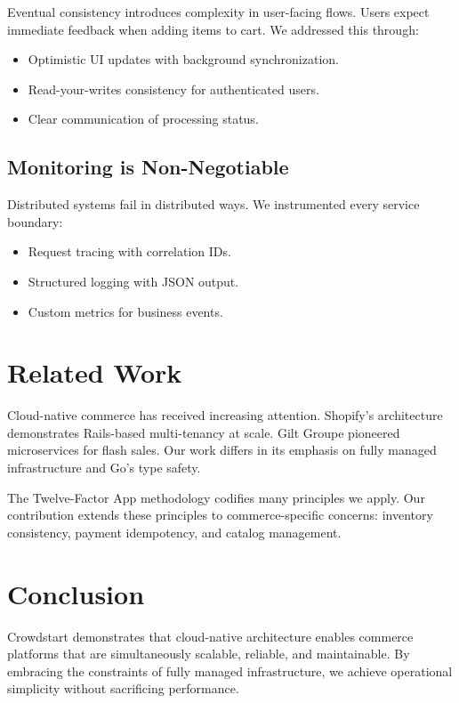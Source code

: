 \documentclass[11pt,twocolumn]{article}
\begin{document}
Eventual consistency introduces complexity in user-facing flows. Users expect immediate feedback when adding items to cart. We addressed this through:
\begin{itemize}
\item Optimistic UI updates with background synchronization.
\item Read-your-writes consistency for authenticated users.
\item Clear communication of processing status.
\end{itemize}

\subsection{Monitoring is Non-Negotiable}

Distributed systems fail in distributed ways. We instrumented every service boundary:
\begin{itemize}
\item Request tracing with correlation IDs.
\item Structured logging with JSON output.
\item Custom metrics for business events.
\end{itemize}

\section{Related Work}

Cloud-native commerce has received increasing attention. Shopify's architecture \cite{shopify2014} demonstrates Rails-based multi-tenancy at scale. Gilt Groupe \cite{gilt2013} pioneered microservices for flash sales. Our work differs in its emphasis on fully managed infrastructure and Go's type safety.

The Twelve-Factor App methodology \cite{wiggins2011} codifies many principles we apply. Our contribution extends these principles to commerce-specific concerns: inventory consistency, payment idempotency, and catalog management.

\section{Conclusion}

Crowdstart demonstrates that cloud-native architecture enables commerce platforms that are simultaneously scalable, reliable, and maintainable. By embracing the constraints of fully managed infrastructure, we achieve operational simplicity without sacrificing performance.
\end{document}
